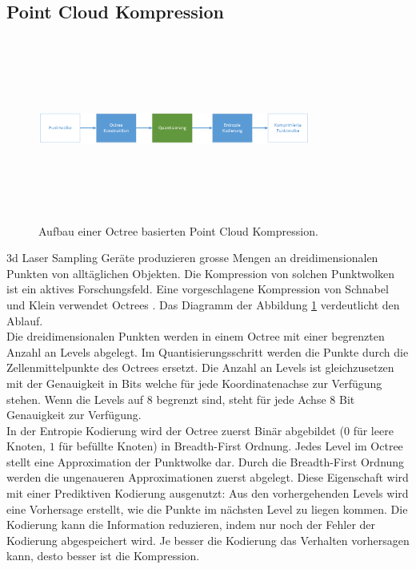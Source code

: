 \subsection{Point Cloud Kompression} \label{state:pointcloud}
\begin{figure}[!htbp]
	\center
	\includegraphics[width=0.8\textwidth,height=6cm,keepaspectratio]{./pictures/state/pointcloud.png}
	\caption{Aufbau einer Octree basierten Point Cloud Kompression.}
	\label{state:pointcloud:abb}
\end{figure}
3d Laser Sampling Geräte produzieren grosse Mengen an dreidimensionalen Punkten von alltäglichen Objekten. Die Kompression von solchen Punktwolken ist ein aktives Forschungsfeld. Eine vorgeschlagene Kompression  von Schnabel und Klein \cite{schnabel2006octree} verwendet Octrees \cite{wiki:octree}. Das Diagramm der Abbildung \ref{state:pointcloud:abb} verdeutlicht den Ablauf.\\
Die dreidimensionalen Punkten werden in einem Octree mit einer begrenzten Anzahl an Levels abgelegt. Im Quantisierungsschritt werden die Punkte durch die Zellenmittelpunkte des Octrees ersetzt. Die Anzahl an Levels ist gleichzusetzen mit der Genauigkeit in Bits welche für jede Koordinatenachse zur Verfügung stehen. Wenn die Levels auf $8$ begrenzt sind, steht für jede Achse $8$ Bit Genauigkeit zur Verfügung.\\
In der Entropie Kodierung wird der Octree zuerst Binär abgebildet ($0$ für leere Knoten, $1$ für befüllte Knoten) in Breadth-First Ordnung. Jedes Level im Octree stellt eine Approximation der Punktwolke dar. Durch die Breadth-First Ordnung werden die ungenaueren Approximationen zuerst abgelegt. Diese Eigenschaft wird mit einer Prediktiven Kodierung ausgenutzt: Aus den vorhergehenden Levels wird eine Vorhersage erstellt, wie die Punkte im nächsten Level zu liegen kommen. Die Kodierung kann die Information reduzieren, indem nur noch der Fehler der Kodierung abgespeichert wird. Je besser die Kodierung das Verhalten vorhersagen kann, desto besser ist die Kompression.

